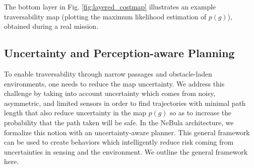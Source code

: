 \documentclass[letterpaper, 10pt, conference]{ieeeconf}      %
\newcommand{\ph}[1]{{\textbf{#1}:}} %
\newcommand{\rev}[1]{{\color{blue}#1}} %
\begin{document}

The bottom layer in Fig. \ref{fig:layered_costmap} illustrates an example traversability map (plotting the maximum likelihood estimation of $p(g)$), obtained during a real mission.




\subsection{Uncertainty and Perception-aware Planning} 
To enable traversability through narrow passages and obstacle-laden environments, one needs to reduce the map uncertainty. We address this challenge by taking into account uncertainty which comes from noisy, asymmetric, and limited sensors in order to find trajectories with minimal path length that also reduce uncertainty in the map $p(g)$ so as to increase the probability that the path taken will be safe. In the NeBula architecture, we formalize this notion with an uncertainty-aware planner.  This general framework can be used to create behaviors which intelligently reduce risk coming from uncertainties in sensing and the environment.  We outline the general framework here.
\end{document}
